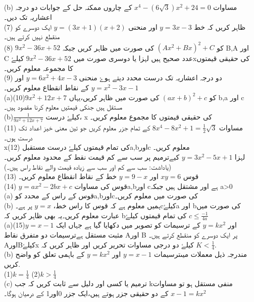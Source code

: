 (b)
مساوات 
\(x^{4}-(6\sqrt{3})x^{2}+24=0\)
کے  چاروں  ممکنہ حل کے جوابات دو درجہ اعشاريہ تک ديں۔\\
(7) ظاہر کريں کہ خط 
\(y=3x-3\)
اور منحنی 
\(y=(3x+1)(x+2)\)
ایک دوسرے کو منقطع نہیں کرتے ہیں۔\\
(8) \(9x^{2}-36x+52\)
کو 
\((Ax^{2}+Bx)^{2}+C\)
کی صورت ميں ظاہر کريں جبکہ B,A اور C عدد صحيح ہيں لہزا يا دوسری صورت ميں 
\(9x^{2}-36x+52\)
کيلۓxکی حقيقی قيمتوں کا مجموعہ معلوم کريں۔\\
(9) دو درجہ اعشاريہ تک درست محدد ديتے ہوۓ منحنی 
\(y=6x^{2}+4x-3\)
اور 
\(y=x^{2}-3x-1\)
کے نقاط انقطاع معلوم کريں۔\\
(a)(10)\(9x^{2}+12x+7\)
کو 
\((ax+b)^{2}+c\)
کی صورت ميں ظاہر کريں،يہاں b,a اور c مستقل ہيں جنکی قيمتيں معلوم کرنا مقصود ہيں۔\\
(b)\(\frac{1}{9x^{2}+12x+7}\)
کیلۓ درست، x کی حقیقی قیمتوں کا مجموع معلوم کریں۔\\
(11) مساوات
\(8x^{4}-8x^{2}+1=\frac{1}{2}\sqrt{3}\)
 کے تمام جزر معلوم کریں جو تین معنی خیز اعداد تک درست ہوں۔\\
x(12) 
کی تمام قیمتوں کیلۓ درست مستقبلa,bاورc معلوم کریں۔\\
لہزا 
\(y=3x^{2}-5x+1\)
کیےترمیم پر سب سے کم قیمت نقط کے محدود معلوم کریں۔\\
(یاداشت: سب سے کم اور سب سے زیادہ قیمت والے نقاط راس ہیں۔)\\
(13) قوس 
\(xy=6\)
اور 
\(y=9-x\)
خط کے نقاط انقطاع معلوم کریں۔\\
(14) \(y=ax^{2}-2bx+c\)
قوس کی مساواتa,bاور cہے اور مشتقل ہیں جبکہ
a>0\\
(a)
قوس کے راس کے محدد کوa,bاورcکی صورت میں معلوم کریں۔\\
(b)
ہمیں معلوم ہے کہ قوس کا راس خط،
\(y=x\)
پر ہے۔cکیلۓa اور bکی صورت میں عبارت معلوم کریں۔یہ بھی ظاہر کریں کہ bکی تمام قیمتوں کیلۓ
\(c\leq\frac{-1}{4a}\)\\
(a)(15)\(y=x-1\)
اور 
\(y=kx^{2}\)
کے ترسیمات کو تصویر میں دکھایا گیا ہے جہاں ایک مثبت مستقل ہےترسیمات دو متفرق نقاط Aاور B پر ایک دوسرے کو منقطع کرتے ہیں۔AاورBکیلۓx کیلۓ دو درجی مساوات تحریر کریں اور ظاہر کریں کہ
\(K<\frac{1}{4}\).\\
(b)
مندرجہ ذیل معملات میںترسیمات 
\(y=x-1\)
اور 
\(y=kx^{2}\)
کے باہمی تعلق کو واضح کریں.\\
(1)\(k=\frac{1}{4}\)   (2)\(k>\frac{1}{4}\)   \\ 
(c)
ترمیم یا کسی اور دلیل سے ثابت کریں کہ جب kمنفی مستقل ہو تو مساوات
\(x-1=kx^{2}\)
 کے دو حقیقی جزر ہوتے ہیں،ایک جزر 0اور1 کے درمیان ہوگا۔

